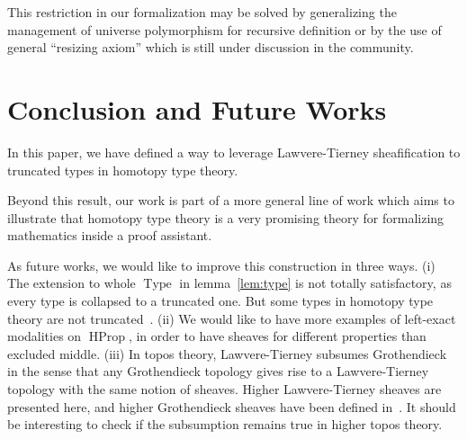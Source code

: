 \documentclass[notfinal]{jfrarticle}
\DeclareMathOperator{\Type}{Type}
\DeclareMathOperator{\HProp}{HProp}
\newcommand{\eg}{\emph{e.g.}}
\begin{document}
%
This restriction in our formalization may be solved by
generalizing the management of universe polymorphism for recursive definition
%
or by the use of general ``resizing axiom'' which is still under
discussion in the community.
 

\section{Conclusion and Future Works}
\label{sec:future-works}

In this paper, we have defined a way to leverage Lawvere-Tierney
sheafification to truncated types in homotopy type theory. 

%
Beyond this result, our work is part of a more general line of work
which aims to illustrate that homotopy type theory is a very promising
theory for formalizing mathematics inside a proof assistant.


As future works, we would like to improve this construction in three
ways.
(i) The extension to whole $\Type$ in lemma~\ref{lem:type} is not
  totally satisfactory, as every type is collapsed to a truncated
  one. But some types in homotopy type theory are not
  truncated~\cite[Example 8.8.6]{hottbook}.
(ii) 
  We would like to have more examples of left-exact modalities on
  $\HProp$, in order to have sheaves for different properties than
  excluded middle.
%
(iii) In topos theory, Lawvere-Tierney subsumes Grothendieck~\cite[Section~V.4]{maclanemoerdijk} in the sense that any
Grothendieck topology gives rise to a Lawvere-Tierney topology with
the same notion of sheaves. Higher Lawvere-Tierney sheaves are
presented here, and higher Grothendieck sheaves have been defined
in~\cite{lurie}. It should be interesting to check if the subsumption
remains true in higher topos theory.
\end{document}
